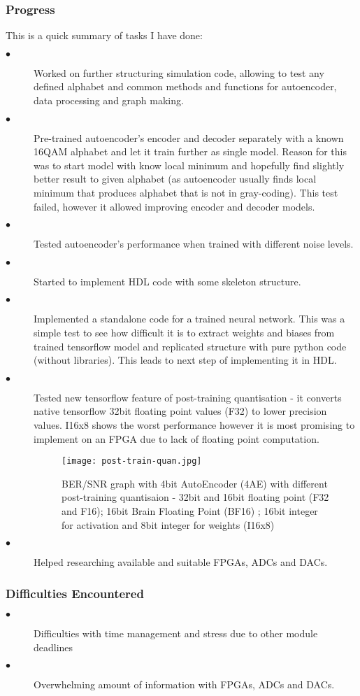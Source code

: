
\subsubsection{Progress}

This is a quick summary of tasks I have done:
\begin{description}
    \item[$\bullet$] Worked on further structuring simulation code, allowing to test any defined alphabet and common methods and functions for autoencoder, data processing and graph making.
	\item[$\bullet$] Pre-trained autoencoder's encoder and decoder separately with a known 16QAM alphabet and let it train further as single model. Reason for this was to start model with know local minimum and hopefully find slightly better result to given alphabet (as autoencoder usually finds local minimum that produces alphabet that is not in gray-coding). This test failed, however it allowed improving encoder and decoder models. 
	\item[$\bullet$] Tested autoencoder's performance when trained with different noise levels.
	\item[$\bullet$] Started to implement HDL code with some skeleton structure.
	\item[$\bullet$] Implemented a standalone code for a trained neural network. This was a simple test to see how difficult it is to extract weights and biases from trained tensorflow model and replicated structure with pure python code (without libraries). This leads to next step of implementing it in HDL. 
	\item[$\bullet$] Tested new tensorflow feature of post-training quantisation - it converts native tensorflow 32bit floating point values (F32) to lower precision values. I16x8 shows the worst performance however it is most promising to implement on an FPGA due to lack of floating point computation.

    \begin{figure}[H]
        \centering
        \texttt{[image: post-train-quan.jpg]}
        \caption{BER/SNR graph with 4bit AutoEncoder (4AE) with different post-training quantisaion - 32bit and 16bit floating point (F32 and F16); 16bit Brain Floating Point (BF16) \autocite{bfloat16}; 16bit integer for activation and 8bit integer for weights (I16x8) \autocite{i16x8}}
    \end{figure}
    
    \item[$\bullet$] Helped researching available and suitable FPGAs, ADCs and DACs. 


\end{description}


\subsubsection{Difficulties Encountered}
\begin{description}
    \item[$\bullet$] Difficulties with time management and stress due to other module deadlines
    \item[$\bullet$] Overwhelming amount of information with FPGAs, ADCs and DACs.
\end{description}